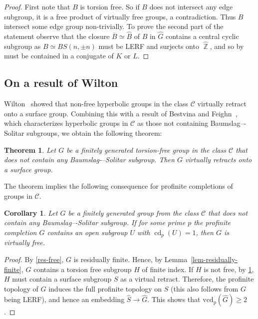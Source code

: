 \documentclass[a4paper]{amsart}
\newtheorem{teo}[lem]{Theorem}
\newtheorem{cor}[lem]{Corollary}
\theoremstyle{definition}
\theoremstyle{remark}
\DeclareMathOperator{\bbz}{\mathbb{Z}}
\DeclareMathOperator{\cd}{\mathrm{cd}}
\begin{document}
\begin{proof} First note that $B$ is torsion free. So if $B$ does not intersect any edge subgroup, it is a free product of virtually free groups, a contradiction. 
Thus  $B$ intersect some edge group non-trivially. To prove the second part of the statement observe that the closure $\overline B \simeq \widehat{B}$ of $B$ in $\widehat G$ contains a central cyclic subgroup as \(B \simeq BS(n,\pm n)\) must be LERF and surjects onto \(\widehat{\bbz}\), and so by \cite[Prop. 4.2.9]{ribesProfiniteGraphsGroups2017} must be contained in a conjugate of $K$ or $L$. 
\end{proof}

\subsection{On a result of Wilton}

Wilton~\cite{Wi18} showed that non-free hyperbolic groups in the class \(\mathcal{C}\) virtually retract onto a surface group. Combining this with a result of Bestvina and Feighn~\cite{BF92}, which characterizes hyperbolic groups in \(\mathcal{C}\) as those not containing Baumslag–-Solitar subgroups, we obtain the following theorem:

\begin{teo}\label{morales}
Let \(G\) be a finitely generated torsion-free group in the class \(\mathcal{C}\) that does not contain any Baumslag-–Solitar subgroup. Then \(G\) virtually retracts onto a surface group.
\end{teo}

The theorem implies the following consequence for profinite completions of groups in \( \mathcal{C} \).

\begin{cor}\label{wilton}
Let \(G\) be a finitely generated group from the class \(\mathcal{C}\) that does not contain any Baumslag–-Solitar subgroup. If for some prime \(p\) the profinite completion \(\widehat{G}\) contains an open subgroup \(U\) with \(\cd_p(U) = 1\), then \(G\) is virtually free.
\end{cor}
\begin{proof} By \cref{res-free}, \(G\) is residually finite. Hence, by Lemma~\ref{lem-residually-finite}, \(G\) contains a torsion free subgroup \(H\) of finite index. If \(H\) is not free, by \cref{morales}, \(H\) must contain a surface subgroup \(S\) as a virtual retract. Therefore, the profinite topology of \(G\) induces the full profinite topology on \(S\) (this also follows from \(G\) being LERF), and hence an embedding \(\widehat{S} \to \widehat G\). This shows that \(\mathrm{vcd_p}(\widehat G) \geq 2\).
\end{proof}
\end{document}
